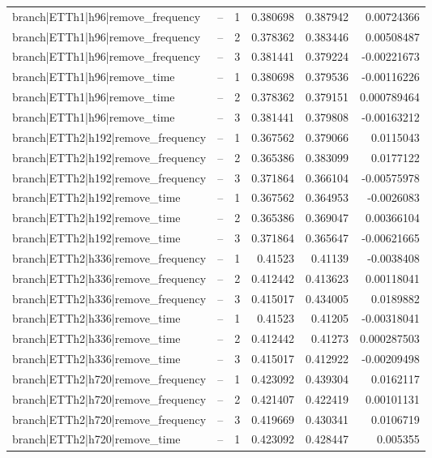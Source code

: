 \begin{longtable}{llrrrr}
branch|ETTh1|h96|remove\_frequency & -- & 1 & 0.380698 & 0.387942 & 0.00724366 \\
branch|ETTh1|h96|remove\_frequency & -- & 2 & 0.378362 & 0.383446 & 0.00508487 \\
branch|ETTh1|h96|remove\_frequency & -- & 3 & 0.381441 & 0.379224 & -0.00221673 \\
branch|ETTh1|h96|remove\_time & -- & 1 & 0.380698 & 0.379536 & -0.00116226 \\
branch|ETTh1|h96|remove\_time & -- & 2 & 0.378362 & 0.379151 & 0.000789464 \\
branch|ETTh1|h96|remove\_time & -- & 3 & 0.381441 & 0.379808 & -0.00163212 \\
branch|ETTh2|h192|remove\_frequency & -- & 1 & 0.367562 & 0.379066 & 0.0115043 \\
branch|ETTh2|h192|remove\_frequency & -- & 2 & 0.365386 & 0.383099 & 0.0177122 \\
branch|ETTh2|h192|remove\_frequency & -- & 3 & 0.371864 & 0.366104 & -0.00575978 \\
branch|ETTh2|h192|remove\_time & -- & 1 & 0.367562 & 0.364953 & -0.0026083 \\
branch|ETTh2|h192|remove\_time & -- & 2 & 0.365386 & 0.369047 & 0.00366104 \\
branch|ETTh2|h192|remove\_time & -- & 3 & 0.371864 & 0.365647 & -0.00621665 \\
branch|ETTh2|h336|remove\_frequency & -- & 1 & 0.41523 & 0.41139 & -0.0038408 \\
branch|ETTh2|h336|remove\_frequency & -- & 2 & 0.412442 & 0.413623 & 0.00118041 \\
branch|ETTh2|h336|remove\_frequency & -- & 3 & 0.415017 & 0.434005 & 0.0189882 \\
branch|ETTh2|h336|remove\_time & -- & 1 & 0.41523 & 0.41205 & -0.00318041 \\
branch|ETTh2|h336|remove\_time & -- & 2 & 0.412442 & 0.41273 & 0.000287503 \\
branch|ETTh2|h336|remove\_time & -- & 3 & 0.415017 & 0.412922 & -0.00209498 \\
branch|ETTh2|h720|remove\_frequency & -- & 1 & 0.423092 & 0.439304 & 0.0162117 \\
branch|ETTh2|h720|remove\_frequency & -- & 2 & 0.421407 & 0.422419 & 0.00101131 \\
branch|ETTh2|h720|remove\_frequency & -- & 3 & 0.419669 & 0.430341 & 0.0106719 \\
branch|ETTh2|h720|remove\_time & -- & 1 & 0.423092 & 0.428447 & 0.005355 \\

\end{longtable}
